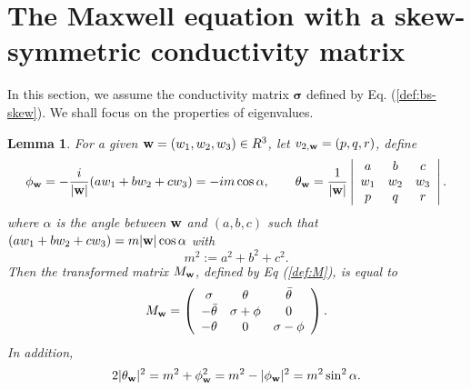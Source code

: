 \documentclass[10pt,reqno]{amsart}
\newcommand{\bS}{\boldsymbol{\sigma}}
\renewcommand{\(}{\left(}
\renewcommand{\)}{\right)}
\newcommand{\bw}{{\bf w}}
\newtheorem{lem}[theo]{Lemma}
\numberwithin{equation}{section}
\begin{document}
\section{The Maxwell equation with a skew-symmetric conductivity matrix}\label{sec:skew}
In this section,  we assume the conductivity matrix $\bS$ defined by Eq. (\ref{def:bs-skew}).
We shall focus on the properties of eigenvalues.
\begin{lem} For a given $\bw=(w_1,w_2,w_3)\in R^3$, let $v_{2,\bw} = (p,q,r)$, define
	\begin{equation}\label{def:phi_theta}
		\phi_{\bw} = -\frac{i}{|\bw|}(aw_1+bw_2+cw_3)=-i m \cos\alpha, \qquad \theta_{\bw} = \frac{1}{|\bw|} \left|
		\begin{array}{ccc}
			a & b & c\\
			w_1 & w_2  & w_3 \\
			p & q & r \\
		\end{array}
		\right|.
	\end{equation}
	where $\alpha$ is the angle between $\bw$ and $(a,b,c)$ such that $(aw_1+bw_2+cw_3) = m|\bw|\cos\alpha $ with
	\[
	 m^2:= a^2+b^2+c^2.
	\]
Then the transformed matrix $M_{\bw}$, defined by Eq (\ref{def:M}), is equal to
	\begin{equation}\label{eq:M_w}
		M_{\bw} = \left(
		\begin{array}{ccc}
			\sigma & \theta & \bar\theta\\
			-\bar\theta & \sigma + \phi & 0 \\
			-\theta & 0 & \sigma - \phi \\
		\end{array}
		\right).
	\end{equation}
	In addition,
	\begin{equation}\label{eq:theta_phi}
		2|\theta_{\bw}|^2 = m^2 +  \phi_{\bw}^2 = m^2- |\phi_{\bw}|^2 =m^2 \sin^2\alpha.  
	\end{equation}
\end{lem}
\end{document}
